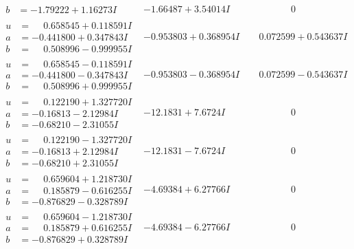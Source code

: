 \documentclass[1p]{elsarticle_modified}
\theoremstyle{definition}
\begin{document}
$$\begin{array}{c|c|c}
\begin{aligned}
b &= -1.79222 + 1.16273 I\end{aligned}
 & -1.66487 + 3.54014 I & \phantom{-0.000000 } 0 \\ \hline\begin{aligned}
u &= \phantom{-}0.658545 + 0.118591 I \\
a &= -0.441800 + 0.347843 I \\
b &= \phantom{-}0.508996 - 0.999955 I\end{aligned}
 & -0.953803 + 0.368954 I & \phantom{-}0.072599 + 0.543637 I \\ \hline\begin{aligned}
u &= \phantom{-}0.658545 - 0.118591 I \\
a &= -0.441800 - 0.347843 I \\
b &= \phantom{-}0.508996 + 0.999955 I\end{aligned}
 & -0.953803 - 0.368954 I & \phantom{-}0.072599 - 0.543637 I \\ \hline\begin{aligned}
u &= \phantom{-}0.122190 + 1.327720 I \\
a &= -0.16813 - 2.12984 I \\
b &= -0.68210 - 2.31055 I\end{aligned}
 & -12.1831 + 7.6724 I & \phantom{-0.000000 } 0 \\ \hline\begin{aligned}
u &= \phantom{-}0.122190 - 1.327720 I \\
a &= -0.16813 + 2.12984 I \\
b &= -0.68210 + 2.31055 I\end{aligned}
 & -12.1831 - 7.6724 I & \phantom{-0.000000 } 0 \\ \hline\begin{aligned}
u &= \phantom{-}0.659604 + 1.218730 I \\
a &= \phantom{-}0.185879 - 0.616255 I \\
b &= -0.876829 - 0.328789 I\end{aligned}
 & -4.69384 + 6.27766 I & \phantom{-0.000000 } 0 \\ \hline\begin{aligned}
u &= \phantom{-}0.659604 - 1.218730 I \\
a &= \phantom{-}0.185879 + 0.616255 I \\
b &= -0.876829 + 0.328789 I\end{aligned}
 & -4.69384 - 6.27766 I & \phantom{-0.000000 } 0 \\ \hline\begin{aligned}

\end{aligned}
\end{array}$$
\end{document}
